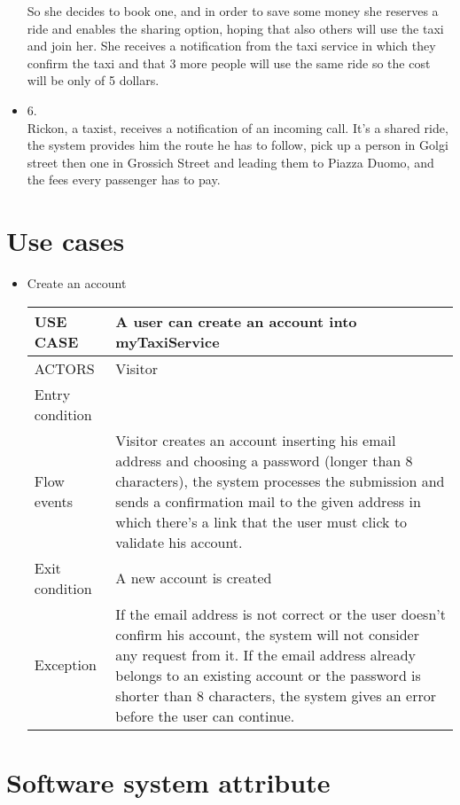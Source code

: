 \begin{itemize}
So she decides to book one, and in order to save some money she reserves a ride and enables the sharing option,
hoping that also others will use the taxi and join her.
She receives a notification from the taxi service in which they confirm the taxi and that 3 more people will use the same ride so the cost will be only of 5 dollars.
\item 6.\\
Rickon, a taxist, receives a notification of an incoming call. It's a shared ride, the system provides him the route he has to follow, pick up a person in Golgi street then 
one in Grossich Street and leading them to Piazza Duomo, and the fees every passenger has to pay.
\end{itemize}

\section {Use cases}
\begin{itemize}
\item Create an account
\begin{center}
    \begin{tabular}{ | l | p{13cm} |}
    \hline
   USE CASE & A user can create an account into myTaxiService \\ \hline
    ACTORS & Visitor \\ \hline
     Entry condition &  \\ \hline
     Flow events & Visitor creates an account inserting his email address and choosing a password (longer than 8 characters), the system processes the submission and sends a confirmation mail to the given address in which there’s a link that the user must click to validate his account. \\ \hline
     Exit condition & A new account is created \\ \hline
     Exception &  If the email address is not correct or the user doesn’t confirm his account, the system will not consider any request from it. If the email address already belongs to an existing account or the password is shorter than 8 characters, the system gives an error before the user can continue.\\ \hline
    \end{tabular}
\end{center}

\end{itemize}

\section{Software system attribute}
